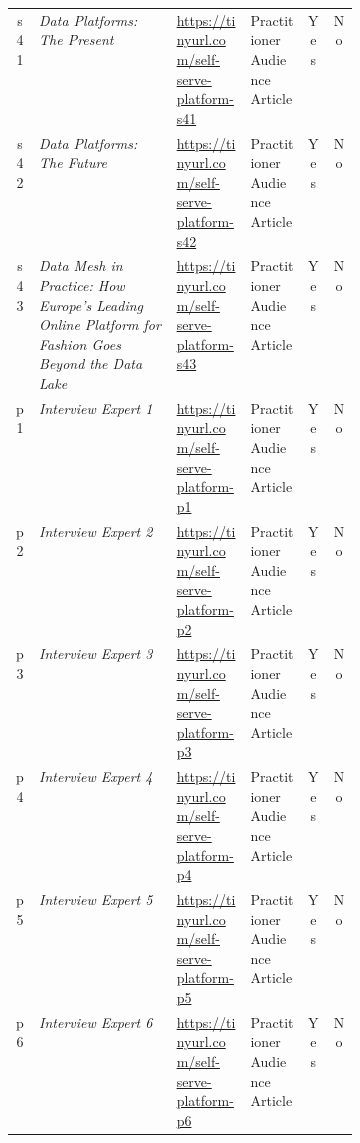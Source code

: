 \begin{tabular}{|c|p{0.4\linewidth}|l|l|c|c|}
s41 &  {\em Data Platforms: The Present} & \href{https://https://tinyurl.com/self-serve-platform-s41}{https://tinyurl.com/self-serve-platform-s41} & Practitioner Audience Article & Yes & No\\
s42 &  {\em Data Platforms: The Future} & \href{https://https://tinyurl.com/self-serve-platform-s42}{https://tinyurl.com/self-serve-platform-s42} & Practitioner Audience Article & Yes & No\\
s43 &  {\em Data Mesh in Practice: How Europe’s Leading Online Platform for Fashion Goes Beyond the Data Lake} & \href{https://https://tinyurl.com/self-serve-platform-s43}{https://tinyurl.com/self-serve-platform-s43} & Practitioner Audience Article & Yes & No\\
p1 &  {\em Interview Expert 1} & \href{https://https://tinyurl.com/self-serve-platform-p1}{https://tinyurl.com/self-serve-platform-p1} & Practitioner Audience Article & Yes & No\\
p2 &  {\em Interview Expert 2} & \href{https://https://tinyurl.com/self-serve-platform-p2}{https://tinyurl.com/self-serve-platform-p2} & Practitioner Audience Article & Yes & No\\
p3 &  {\em Interview Expert 3} & \href{https://https://tinyurl.com/self-serve-platform-p3}{https://tinyurl.com/self-serve-platform-p3} & Practitioner Audience Article & Yes & No\\
p4 &  {\em Interview Expert 4} & \href{https://https://tinyurl.com/self-serve-platform-p4}{https://tinyurl.com/self-serve-platform-p4} & Practitioner Audience Article & Yes & No\\
p5 &  {\em Interview Expert 5} & \href{https://https://tinyurl.com/self-serve-platform-p5}{https://tinyurl.com/self-serve-platform-p5} & Practitioner Audience Article & Yes & No\\
p6 &  {\em Interview Expert 6} & \href{https://https://tinyurl.com/self-serve-platform-p6}{https://tinyurl.com/self-serve-platform-p6} & Practitioner Audience Article & Yes & No\\
\bottomrule
\end{tabular}
